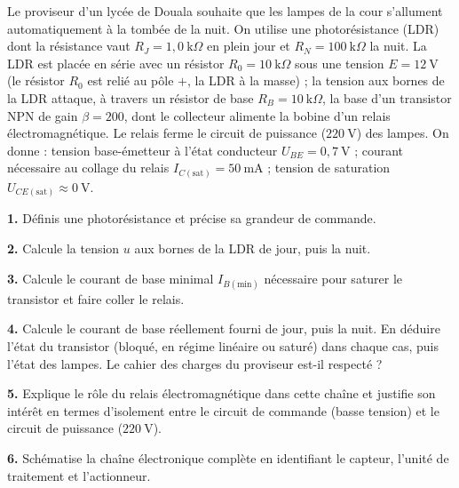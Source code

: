 \documentclass[11pt]{article}
\begin{document}
\begin{exercice}
Le proviseur d'un lycée de Douala souhaite que les lampes de la cour s'allument automatiquement à la tombée de la nuit. On utilise une photorésistance (LDR) dont la résistance vaut $R_J = 1{,}0~\text{k}\Omega$ en plein jour et $R_N = 100~\text{k}\Omega$ la nuit. La LDR est placée en série avec un résistor $R_0 = 10~\text{k}\Omega$ sous une tension $E = 12~\text{V}$ (le résistor $R_0$ est relié au pôle $+$, la LDR à la masse) ; la tension aux bornes de la LDR attaque, à travers un résistor de base $R_B = 10~\text{k}\Omega$, la base d'un transistor NPN de gain $\beta = 200$, dont le collecteur alimente la bobine d'un relais électromagnétique. Le relais ferme le circuit de puissance ($220~\text{V}$) des lampes. On donne : tension base-émetteur à l'état conducteur $U_{BE} = 0{,}7~\text{V}$ ; courant nécessaire au collage du relais $I_{C(\text{sat})} = 50~\text{mA}$ ; tension de saturation $U_{CE(\text{sat})} \approx 0~\text{V}$.

\textbf{1.} Définis une photorésistance et précise sa grandeur de commande.

\textbf{2.} Calcule la tension $u$ aux bornes de la LDR de jour, puis la nuit.

\textbf{3.} Calcule le courant de base minimal $I_{B(\text{min})}$ nécessaire pour saturer le transistor et faire coller le relais.

\textbf{4.} Calcule le courant de base réellement fourni de jour, puis la nuit. En déduire l'état du transistor (bloqué, en régime linéaire ou saturé) dans chaque cas, puis l'état des lampes. Le cahier des charges du proviseur est-il respecté ?

\textbf{5.} Explique le rôle du relais électromagnétique dans cette chaîne et justifie son intérêt en termes d'isolement entre le circuit de commande (basse tension) et le circuit de puissance ($220~\text{V}$).

\textbf{6.} Schématise la chaîne électronique complète en identifiant le capteur, l'unité de traitement et l'actionneur.
\end{exercice}
\end{document}
